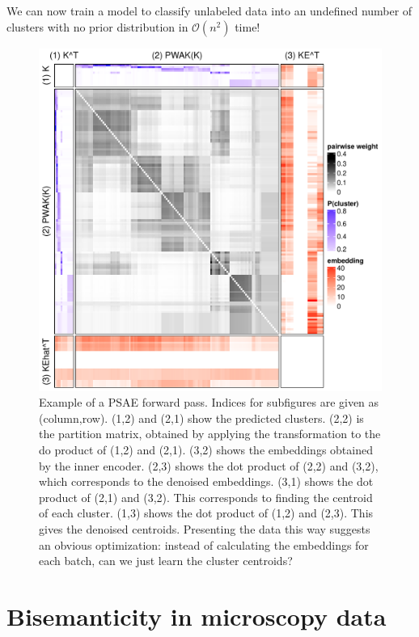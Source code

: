 We can now train a model to classify unlabeled data into an undefined number of clusters with no prior distribution in $\mathcal{O}(n^2)$ time!

\begin{figure}
    \centering
    \includegraphics{fig/pwak.pdf}
    \caption{Example of a PSAE forward pass. Indices for subfigures are given as \textsf{(column,row)}.
    \textsf{(1,2)} and \textsf{(2,1)} show the predicted clusters.
    \textsf{(2,2)} is the partition matrix, obtained by applying the \PWAK transformation to the do product of
    \textsf{(1,2)} and \textsf{(2,1)}.
    \textsf{(3,2)} shows the embeddings obtained by the inner encoder.
    \textsf{(2,3)} shows the dot product of \textsf{(2,2)} and \textsf{(3,2)}, which corresponds to the denoised embeddings.
    \textsf{(3,1)} shows the dot product of \textsf{(2,1)} and \textsf{(3,2)}. This corresponds to finding the centroid of
    each cluster.
    \textsf{(1,3)} shows the dot product of \textsf{(1,2)} and \textsf{(2,3)}. This gives the denoised centroids.
    Presenting the data this way suggests an obvious optimization:
    instead of calculating the embeddings for each batch, can we just learn the cluster centroids?
    }
    \label{fig:pwak}
\end{figure}

\section{Bisemanticity in microscopy data}
\label{app:micro}

